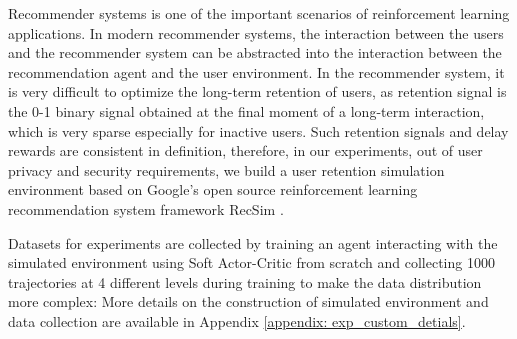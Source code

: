 Recommender systems is one of the important scenarios of reinforcement learning applications. In modern recommender systems, the interaction between the users and the recommender system can be abstracted into the interaction between the recommendation agent and the user environment. In the recommender system, it is very difficult to optimize the long-term retention of users,  as retention signal is the 0-1 binary signal obtained at the final moment of a long-term interaction, which is very sparse especially for inactive users. Such retention signals and delay rewards are consistent in definition, therefore, in our experiments, out of user privacy and security requirements, we build a user retention simulation environment based on Google’s open source reinforcement learning recommendation system framework RecSim \cite{ieRecSimConfigurableSimulation2019}.

Datasets for experiments are collected by training an agent interacting with the simulated environment
using Soft Actor-Critic \cite{haarnoja2018soft} from scratch and collecting 1000 trajectories at
4 different levels during training to make the data distribution more complex:
More details on the construction of simulated environment and data collection are available in Appendix \ref{appendix: exp_custom_detials}.

